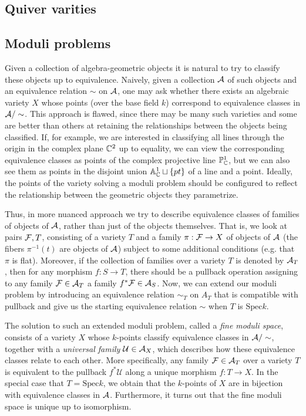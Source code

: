     \subsection{Quiver varities}

    \subsection{Moduli problems}

        Given a collection of algebra-geometric objects it is natural to try to classify these objects up to equivalence. Naively, given a collection $\mathcal{A}$ of such objects and an equivalence relation $\sim$ on $\mathcal{A}$, one may ask whether there exists an algebraic variety $X$ whose points (over the base field $k$) correspond to equivalence classes in $\mathcal{A}/\sim$. This approach is flawed, since there may be many such varieties and some are better than others at retaining the relationships between the objects being classified. If, for example, we are interested in classifying all lines through the origin in the complex plane $\mathbb{C}^2$ up to equality, we can view the corresponding equivalence classes as points of the complex projective line $\mathbb{P}^1_{\mathbb{C}}$, but we can also see them as points in the disjoint union $\mathbb{A}^1_{\mathbb{C}}\sqcup\{pt\}$ of a line and a point. Ideally, the points of the variety solving a moduli problem should be configured to reflect the relationship between the geometric objects they parametrize.
        
        Thus, in more nuanced approach we try to describe equivalence classes of families of objects of $\mathcal{A}$, rather than just of the objects themselves. That is, we look at pairs $\mathcal{F},T$, consisting of a variety $T$ and a family $\pi:\mathcal{F}\to X$ of objects of $\mathcal{A}$ (the fibers $\pi^{-1}(t)$ are objects of $\mathcal{A}$) subject to some additional conditions (e.g. that $\pi$ is flat). Moreover, if the collection of families over a variety $T$ is denoted by $\mathcal{A}_T$, then for any morphism $f:S\to T$, there should be a pullback operation assigning to any family $\mathcal{F}\in \mathcal{A}_T$ a family $f^*\mathcal{F}\in\mathcal{A}_S$. Now, we can extend our moduli problem by introducing an equivalence relation $\sim_T$ on $A_T$ that is compatible with pullback and give us the starting equivalence relation $\sim$ when $T$ is $\text{Spec}k$.
        
        The solution to such an extended moduli problem, called a \emph{fine moduli space}, consists of a variety $X$ whose $k$-points classify equivalence classes in $\mathcal{A}/\sim$, together with a \emph{universal family} $\mathcal{U}\in\mathcal{A}_X$, which describes how these equivalence classes relate to each other. More specifically, any family $\mathcal{F}\in\mathcal{A}_T$ over a variety $T$ is equivalent to the pullback $f^*\mathcal{U}$ along a unique morphism $f:T\to X$. In the special case that $T=\text{Spec}k$, we obtain that the $k$-points of $X$ are in bijection with equivalence classes in $\mathcal{A}$. Furthermore, it turns out that the fine moduli space is
        unique up to isomorphism. 
        

